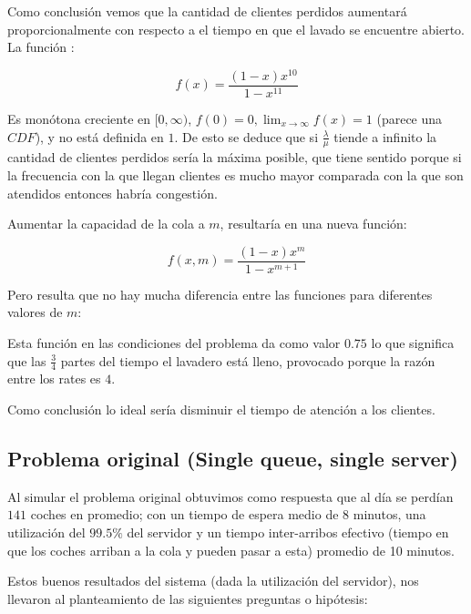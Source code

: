 \documentclass[14pt]{extarticle}
\begin{document}
    \begin{figure}[htbp]
  \centering
  

\end{figure}

Como conclusión vemos que la cantidad de clientes perdidos aumentará proporcionalmente con respecto a el tiempo en que el lavado se encuentre abierto. La función :

$$f(x) = \frac{(1-x)x^{10}}{1-x^{11}}$$

Es monótona creciente en $[0, \infty)$, $f(0) = 0, \lim_{x \to \infty} f(x) = 1$ (parece una $CDF$), y no está definida en $1$. De esto se deduce que si $\frac{\lambda}{\mu}$ tiende a infinito la cantidad de clientes perdidos sería la máxima posible, que tiene sentido porque si la frecuencia con la que llegan clientes es mucho mayor comparada con la que son atendidos entonces habría congestión.

Aumentar la capacidad de la cola a $m$, resultaría en una nueva función:

$$f(x, m) = \frac{(1-x)x^{m}}{1-x^{m+1}}$$

Pero resulta que no hay mucha diferencia entre las funciones para diferentes valores de $m$:

\begin{figure}[htbp]
    \centering
    
  \end{figure}

Esta función en las condiciones del problema da como valor $0.75$ lo que significa que las $\frac{3}{4}$ partes del tiempo el lavadero está lleno, provocado porque la razón entre los rates es $4$.

Como conclusión lo ideal sería disminuir el tiempo de atención a los clientes.

\subsection{ Problema original (Single queue, single server)}

Al simular el problema original obtuvimos como respuesta que al día se perdían $141$ coches en promedio; con un tiempo de espera medio de $8$ minutos, una utilización del $99.5 \%$ del servidor y un tiempo inter-arribos efectivo (tiempo en que los coches arriban a la cola y pueden pasar a esta) promedio de 10 minutos.

Estos buenos resultados del sistema (dada la utilización del servidor), nos llevaron al planteamiento de las siguientes preguntas o hipótesis:
\end{document}
